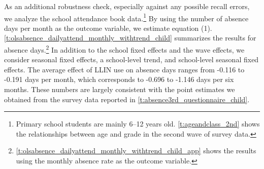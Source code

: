 \documentclass[fleqn,11pt]{article}
\begin{document}
As an additional robustness check, especially against any possible recall errors, we analyze the school attendance book data.\footnote{Primary school students are mainly 6--12 years old.
\autoref{t:ageandclass_2nd} shows the relationships between age and grade
in the second wave of survey data.} By using the number of absence days per month as the outcome variable, we estimate equation (1). 
\autoref{t:olsabsence_dailyattend_monthly_withtrend_child} summarizes the results for absence days.\footnote{\autoref{t:olsabsence_dailyattend_monthly_withtrend_child_app} shows the results using the monthly absence rate as the outcome variable.} In addition to the school fixed effects and the wave effects, we consider seasonal fixed effects, a school-level trend, and school-level seasonal fixed effects.
The average effect of LLIN use on absence days ranges from -0.116 to -0.191 days per month, which corresponds to -0.696 to -1.146 days per six months. These numbers are largely consistent with the point estimates we obtained from the survey data reported in \autoref{t:absence3rd_questionnaire_child}. 
 

\end{document}
